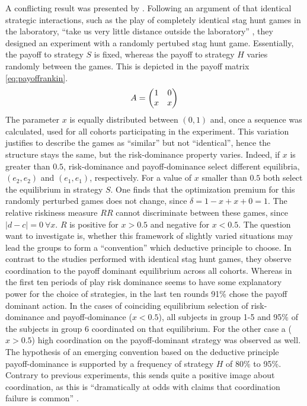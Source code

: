A conflicting result was presented by \textcite{rankin_strategic_2000}.
Following an argument of \textcite{kreps_game_1990} that identical strategic 
interactions, such as the play of completely identical stag hunt games 
in the laboratory, ``take us very little distance outside the laboratory'' 
\parencite[212]{kreps_game_1990}, 
they designed an experiment with a randomly 
pertubed stag hunt game. Essentially, the payoff to strategy $S$ is fixed, 
whereas the payoff to strategy $H$ varies randomly between the games. This is
depicted in the payoff matrix  \eqref{eq:payoffrankin}.
\begin{align}
        \label{eq:payoffrankin}
        A = \mqty(1 & 0 \\ x & x)
\end{align}        
The parameter $x$ is equally distributed between $(0,1)$ and, once a sequence
was calculated, used for all cohorts participating in the experiment. This
variation justifies to describe the games as ``similar'' but not
``identical'', hence the structure stays the same, but the risk-dominance 
property varies. Indeed, if $x$ is greater than $0.5$, risk-dominance and
payoff-dominance select different equilibria, $(e_2,e_2)$ and $(e_1,e_1)$,
respectively. For a value of $x$ smaller than $0.5$ both select 
the equilibrium in strategy $S$. One finds that the optimization premium for 
this randomly perturbed games does not change, since $\delta=1-x+x+0=1$. 
The relative riskiness measure $RR$ cannot discriminate between these games,
since $|d-c|=0\ \forall x$. $R$ is positive for $x > 0.5$ and 
negative for $x <0.5$. The question \textcite{rankin_strategic_2000}
want to investigate is, whether this framework of slightly varied situations may
lead the groups to form a ``convention'' which deductive principle to choose. 
In contrast to the studies performed with identical stag hunt games, they 
observe coordination to the payoff dominant equilibrium across
all cohorts. Whereas in the first ten periods of play risk dominance seems
to have some explanatory power for the choice of strategies, in the last ten
rounds 91\% chose the payoff dominant action. 
In the cases of coinciding equilibrium selection of risk-dominance and 
payoff-dominance ($x < 0.5$), all subjects in group 1-5 
and 95\% of the subjects in group 6 coordinated on that equilibrium.
For the other case a ($x >0.5$) high coordination on the payoff-dominant 
strategy was observed as well.
The hypothesis of an emerging convention based on the deductive principle
payoff-dominance is supported by a frequency of strategy $H$ of 80\% to 95\%.
Contrary to previous experiments, this sends 
quite a positive image about coordination, as this is 
``dramatically at odds with claims that coordination failure is common''
\parencite[9]{devetag_when_2007}. 

